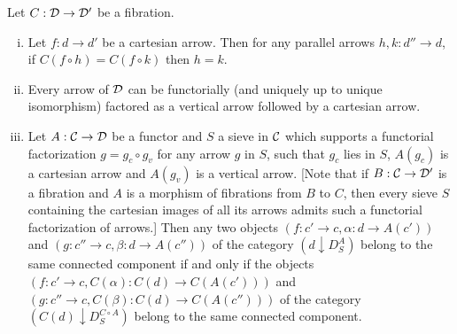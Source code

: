 \documentclass[a4paper,12pt]{article}
\begin{document}
\begin{lemma}\label{lemmacartesianrelmono}
	Let $C:{\cal D}\to {\cal D}'$ be a fibration.
	\begin{enumerate}[(i)]
		\item Let $f:d\to d'$ be a cartesian arrow. Then for any parallel arrows $h, k:d''\to d$, if $C(f\circ h)=C(f\circ k)$ then $h=k$.
		
		\item Every arrow of $\cal D$ can be functorially (and uniquely up to unique isomorphism) factored as a vertical arrow followed by a cartesian arrow.
		
		\item Let $A:{\cal C}\to {\cal D}$ be a functor and $S$ a sieve in $\cal C$ which supports a functorial factorization $g=g_{c}\circ g_{v}$ for any arrow $g$ in $S$, such that $g_{c}$ lies in $S$, $A(g_{c})$ is a cartesian arrow and $A(g_{v})$ is a vertical arrow. [Note that if $B:{\cal C}\to {\cal D'}$ is a fibration and $A$ is a morphism of fibrations from $B$ to $C$, then every sieve $S$ containing the cartesian images of all its arrows admits such a functorial factorization of arrows.] Then any two objects $(f:c' \to c, \alpha:d\to A(c'))$ and $(g:c''\to c, \beta:d\to A(c''))$ of the category $(d\downarrow D^{A}_{S})$ belong to the same connected component if and only if the objects $(f:c' \to c, C(\alpha):C(d)\to C(A(c')))$ and $(g:c''\to c, C(\beta):C(d)\to C(A(c'')))$ of the category $(C(d)\downarrow D^{C\circ A}_{S})$ belong to the same connected component.
	\end{enumerate}	 
\end{lemma}
\end{document}
